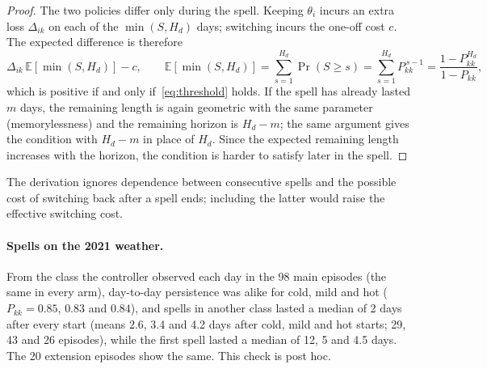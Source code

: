 \begin{proof}
The two policies differ only during the spell. Keeping $\theta_i$ incurs an extra loss $\Delta_{ik}$ on each of the
$\min(S,H_d)$ days; switching incurs the one-off cost $c$. The expected difference is therefore
\[
  \Delta_{ik}\,\mathbb{E}[\min(S,H_d)] - c,
  \qquad
  \mathbb{E}[\min(S,H_d)] = \sum_{s=1}^{H_d} \Pr(S \ge s) = \sum_{s=1}^{H_d} P_{kk}^{\,s-1} = \frac{1-P_{kk}^{H_d}}{1-P_{kk}},
\]
which is positive if and only if~\eqref{eq:threshold} holds. If the spell has already lasted $m$ days, the remaining
length is again geometric with the same parameter (memorylessness) and the remaining horizon is $H_d-m$; the same
argument gives the condition with $H_d-m$ in place of $H_d$. Since the expected remaining length increases with the
horizon, the condition is harder to satisfy later in the spell.
\end{proof}

The derivation ignores dependence between consecutive spells and the possible cost of switching back after a spell
ends; including the latter would raise the effective switching cost.

\paragraph{Spells on the 2021 weather.} From the class the controller observed each day in the 98 main episodes (the same in
every arm), day-to-day persistence was alike for cold, mild and hot ($P_{kk} = 0.85$, $0.83$ and $0.84$), and spells in
another class lasted a median of 2 days after every start (means 2.6, 3.4 and 4.2 days after cold, mild and hot starts; 29,
43 and 26 episodes), while the first spell lasted a median of 12, 5 and 4.5 days. The 20 extension episodes show the same.
This check is post hoc.

